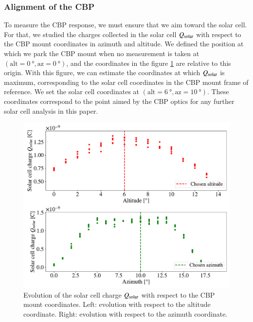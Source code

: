 \subsubsection{Alignment of the CBP}

To measure the CBP response, we must ensure that we aim toward the solar cell. For that, we studied the charges collected in the solar cell $Q_{\mathrm{solar}}$ with respect to the CBP mount coordinates in azimuth and altitude. We defined the position at which we park the CBP mount when no measurement is taken at $(\mathrm{alt} = \SI{0}{\degree}, \mathrm{az} = \SI{0}{\degree})$, and the coordinates in the figure \ref{fig:cross_sc} are relative to this origin. With this figure, we can estimate the coordinates at which $Q_{\mathrm{solar}}$ is maximum, corresponding to the solar cell coordinates in the CBP mount frame of reference. We set the solar cell coordinates at $(\mathrm{alt} = \SI{6}{\degree}, \mathrm{az} = \SI{10}{\degree})$. These coordinates correspond to the point aimed by the CBP optics for any further solar cell analysis in this paper.

\begin{figure}[h]
    \centering
    \includegraphics[width=\columnwidth]{fig/cross_solarcell.pdf}
    \caption{Evolution of the solar cell charge $Q_{\mathrm{solar}}$ with respect to the CBP mount coordinates. Left: evolution with respect to the altitude coordinate. Right: evolution with respect to the azimuth coordinate.}
    \label{fig:cross_sc}
\end{figure}

